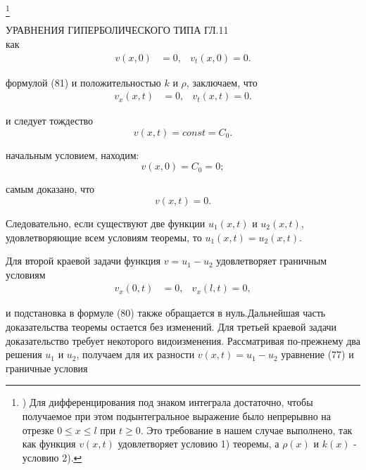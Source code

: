 \documentclass{article}
\begin{document}
\footnote{) Для дифференцирования под знаком интеграла достаточно, чтобы получаемое при этом подынтегральное выражение было непрерывно на отрезке $0 \le x \le l$ при $t \ge 0$. Это требование в нашем случае выполнено, так как функция $v(x, t)$ удовлетворяет условию 1) теоремы, а $\rho(x)$ и $k(x)$ - условию 2).}

\newpage
{} \hfill УРАВНЕНИЯ ГИПЕРБОЛИЧЕСКОГО ТИПА \hfill ГЛ.11 \\

 как
\begin{equation}
\begin{aligned}
v(x,0)&=0, & v_t(x,0)=0.
\end{aligned}
\tag*{}
\end{equation}

 формулой (81) и положительностью $k$ и $\rho$, заключаем, что
\begin{equation}
\begin{aligned}
v_x(x,t)&=0, & v_t(x,t)=0.
\end{aligned}
\tag*{}
\end{equation}

 и следует тождество
\begin{equation}
v(x,t)=const=C_0.
\tag{82}
\end{equation}

 начальным условием, находим:
\[v(x,0)=C_0=0;\]


 самым доказано, что 
\begin{equation}
v(x,t)=0.
\tag{83}
\end{equation}

\noindent Следовательно, если существуют две функции $u_1(x,t)$ и $u_2(x,t)$, удовлетворяющие всем условиям теоремы, то $u_1(x,t)=u_2(x,t)$.

Для второй краевой задачи функция $v=u_1 - u_2$ удовлетворяет граничным условиям
\begin{equation}
\begin{aligned}
v_x(0,t)&=0, & v_x(l,t)=0,
\end{aligned}
\tag{84}
\end{equation}

\noindent и подстановка в формуле (80) также обращается в нуль.Дальнейшая часть доказательства теоремы остается без изменений.
Для третьей краевой задачи доказательство требует некоторого видоизменения. Рассматривая по-прежнему два решения $u_1$ и $u_2$, получаем для их разности $v(x,t) = u_1 - u_2$ уравнение (77) и граничные условия
\end{document}
